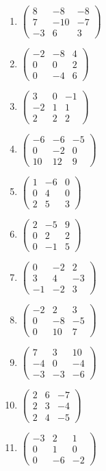 \begin{enumerate}[label=\arabic*., leftmargin=*]
\item $\begin{pmatrix}8 & -8 & -8\\ 7 & -10 & -7\\ -3 & 6 & 3\end{pmatrix}$
\item $\begin{pmatrix}-2 & -8 & 4\\ 0 & 0 & 2\\ 0 & -4 & 6\end{pmatrix}$
\item $\begin{pmatrix}3 & 0 & -1\\ -2 & 1 & 1\\ 2 & 2 & 2\end{pmatrix}$
\item $\begin{pmatrix}-6 & -6 & -5\\ 0 & -2 & 0\\ 10 & 12 & 9\end{pmatrix}$
\item $\begin{pmatrix}1 & -6 & 0\\ 0 & 4 & 0\\ 2 & 5 & 3\end{pmatrix}$
\item $\begin{pmatrix}2 & -5 & 9\\ 0 & 2 & 2\\ 0 & -1 & 5\end{pmatrix}$
\item $\begin{pmatrix}0 & -2 & 2\\ 3 & 4 & -3\\ -1 & -2 & 3\end{pmatrix}$
\item $\begin{pmatrix}-2 & 2 & 3\\ 0 & -8 & -5\\ 0 & 10 & 7\end{pmatrix}$
\item $\begin{pmatrix}7 & 3 & 10\\ -4 & 0 & -4\\ -3 & -3 & -6\end{pmatrix}$
\item $\begin{pmatrix}2 & 6 & -7\\ 2 & 3 & -4\\ 2 & 4 & -5\end{pmatrix}$
\item $\begin{pmatrix}-3 & 2 & 1\\ 0 & 1 & 0\\ 0 & -6 & -2\end{pmatrix}$
\end{enumerate}


